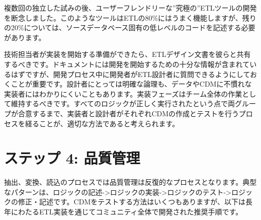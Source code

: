 \documentclass[
  11pt]{book}
\theoremstyle{definition}
\theoremstyle{definition}
\theoremstyle{definition}
\theoremstyle{definition}
\theoremstyle{remark}
\begin{document}
複数回の独立した試みの後、ユーザーフレンドリーな''究極の''ETLツールの開発を断念しました。このようなツールはETLの80\%にはうまく機能しますが、残りの20\%については、ソースデータベース固有の低レベルのコードを記述する必要があります。

技術担当者が実装を開始する準備ができたら、ETLデザイン文書を彼らと共有するべきです。ドキュメントには開発を開始するための十分な情報が含まれているはずですが、開発プロセス中に開発者がETL設計者に質問できるようにしておくことが重要です。設計者にとっては明確な論理も、データやCDMに不慣れな実装者にはわかりにくいこともあります。実装フェーズはチーム全体の作業として維持するべきです。すべてのロジックが正しく実行されたという点で両グループが合意するまで、実装者と設計者がそれぞれCDMの作成とテストを行うプロセスを経ることが、適切な方法であると考えられます。

\section{ステップ 4: 品質管理}\label{ux30b9ux30c6ux30c3ux30d7-4-ux54c1ux8ceaux7ba1ux7406}

抽出、変換、読込のプロセスでは品質管理は反復的なプロセスとなります。典型なパターンは、ロジックの記述-\textgreater ロジックの実装-\textgreater ロジックのテスト-\textgreater ロジックの修正・記述です。CDMをテストする方法はいくつもありますが、以下は長年にわたるETL実装を通じてコミュニティ全体で開発された推奨手順です。 
\end{document}

